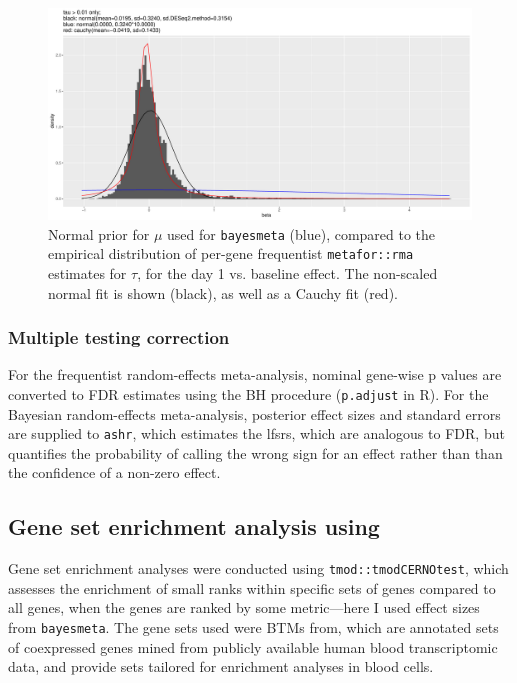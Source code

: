 \begin{figure}
    \includegraphics[width=1.0\textwidth,page=1]{mainmatter/figures/chapter_02/meta.bayesmeta.priors.coefName_d1.vs.d0.pdf}
    \caption{Normal prior for $\mu$ used for \texttt{bayesmeta} (blue), compared to the empirical distribution of per-gene frequentist \texttt{metafor::rma} estimates for $\tau$, for the day 1 vs. baseline effect. The non-scaled normal fit is shown (black), as well as a Cauchy fit (red).}
    \label{fig:hird_dgeMeta_priors_mu}
\end{figure}

\subsubsection{Multiple testing correction}

For the frequentist random-effects meta-analysis, nominal gene-wise p values are converted to \gls{FDR} estimates using the \gls{BH} procedure (\texttt{p.adjust} in R).
For the Bayesian random-effects meta-analysis, posterior effect sizes and standard errors are supplied to \texttt{ashr}, which estimates the \glspl{lfsr}, which are analogous to \gls{FDR}, but quantifies the probability of calling the wrong sign for an effect rather than than the confidence of a non-zero effect\autocite{stephens2016FalseDiscoveryRates}.
%

\subsection{Gene set enrichment analysis using }

Gene set enrichment analyses were conducted using \texttt{tmod::tmodCERNOtest}\autocite{weiner3rd2016TmodPackageGeneral}, which assesses the enrichment of small ranks within specific sets of genes compared to all genes, when the genes are ranked by some metric---here I used effect sizes from \texttt{bayesmeta}.
The gene sets used were \glspl{BTM} from\autocite{li2013MolecularSignaturesAntibody}, which are annotated sets of coexpressed genes mined from publicly available human blood transcriptomic data, and provide sets tailored for enrichment analyses in blood cells.

